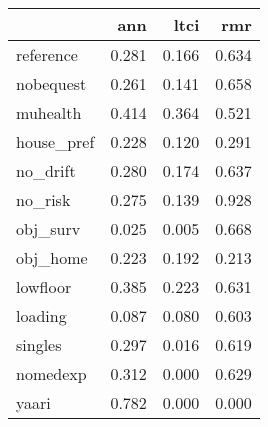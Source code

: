 \begin{tabular}{lrrr}
\toprule
{} &    ann &   ltci &    rmr \\
\midrule
reference  &  0.281 &  0.166 &  0.634 \\
nobequest  &  0.261 &  0.141 &  0.658 \\
muhealth   &  0.414 &  0.364 &  0.521 \\
house\_pref &  0.228 &  0.120 &  0.291 \\
no\_drift   &  0.280 &  0.174 &  0.637 \\
no\_risk    &  0.275 &  0.139 &  0.928 \\
obj\_surv   &  0.025 &  0.005 &  0.668 \\
obj\_home   &  0.223 &  0.192 &  0.213 \\
lowfloor   &  0.385 &  0.223 &  0.631 \\
loading    &  0.087 &  0.080 &  0.603 \\
singles    &  0.297 &  0.016 &  0.619 \\
nomedexp   &  0.312 &  0.000 &  0.629 \\
yaari      &  0.782 &  0.000 &  0.000 \\
\bottomrule
\end{tabular}
